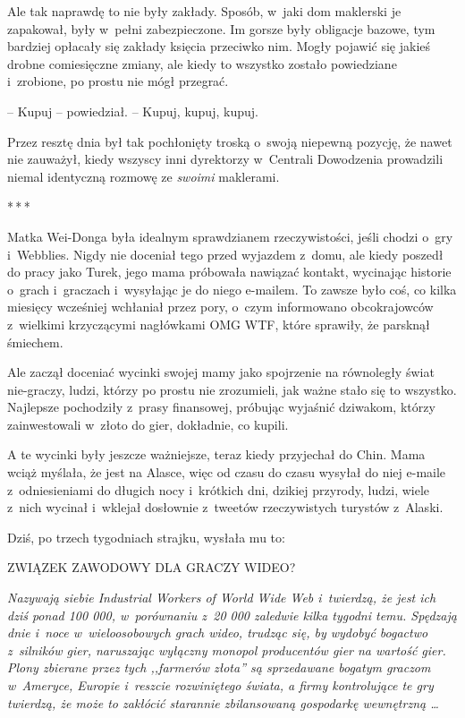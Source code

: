 \documentclass[oneside,polish,11pt,rmheadings]{mwbk}
\newcommand{\threeast}{\par\centerline{*\,*\,*}\medskip\par}
\begin{document}
Ale tak naprawdę to nie były zakłady. Sposób, w~jaki dom maklerski je zapakował, były w~pełni zabezpieczone. Im gorsze były obligacje bazowe, tym bardziej opłacały się zakłady księcia przeciwko nim. Mogły pojawić się jakieś drobne comiesięczne zmiany, ale kiedy to wszystko zostało powiedziane i~zrobione, po prostu nie mógł przegrać.

-- Kupuj -- powiedział. -- Kupuj, kupuj, kupuj.

Przez resztę dnia był tak pochłonięty troską o~swoją niepewną pozycję, że nawet nie zauważył, kiedy wszyscy inni dyrektorzy w~Centrali Dowodzenia prowadzili niemal identyczną rozmowę ze \textit{swoimi} maklerami.

\bigskip
\threeast

Matka Wei-Donga była idealnym sprawdzianem rzeczywistości, jeśli chodzi o~gry i~Webblies. Nigdy nie doceniał tego przed wyjazdem z~domu, ale kiedy poszedł do pracy jako Turek, jego mama próbowała nawiązać kontakt, wycinając historie o~grach i~graczach i~wysyłając je do niego e-mailem. To zawsze było coś, co kilka miesięcy wcześniej wchłaniał przez pory, o~czym informowano obcokrajowców z~wielkimi krzyczącymi nagłówkami OMG WTF, które sprawiły, że parsknął śmiechem.

Ale zaczął doceniać wycinki swojej mamy jako spojrzenie na równoległy świat nie-graczy, ludzi, którzy po prostu nie zrozumieli, jak ważne stało się to wszystko. Najlepsze pochodziły z~prasy finansowej, próbując wyjaśnić dziwakom, którzy zainwestowali w~złoto do gier, dokładnie, co kupili.

A te wycinki były jeszcze ważniejsze, teraz kiedy przyjechał do Chin. Mama wciąż myślała, że jest na Alasce, więc od czasu do czasu wysyłał do niej e-maile z~odniesieniami do długich nocy i~krótkich dni, dzikiej przyrody, ludzi, wiele z~nich wycinał i~wklejał dosłownie z~tweetów rzeczywistych turystów z~Alaski.

Dziś, po trzech tygodniach strajku, wysłała mu to:

\noindent ZWIĄZEK ZAWODOWY DLA GRACZY WIDEO?

\textit{Nazywają siebie Industrial Workers of World Wide Web i~twierdzą, że jest ich dziś ponad 100 000, w~porównaniu z~20 000 zaledwie kilka tygodni temu. Spędzają dnie i~noce w~wieloosobowych grach wideo, trudząc się, by wydobyć bogactwo z~silników gier, naruszając wyłączny monopol producentów gier na wartość gier. Plony zbierane przez tych ,,farmerów złota'' są sprzedawane bogatym graczom w~Ameryce, Europie i~reszcie rozwiniętego świata, a firmy kontrolujące te gry twierdzą, że może to zakłócić starannie zbilansowaną gospodarkę wewnętrzną \ldots }
\end{document}
